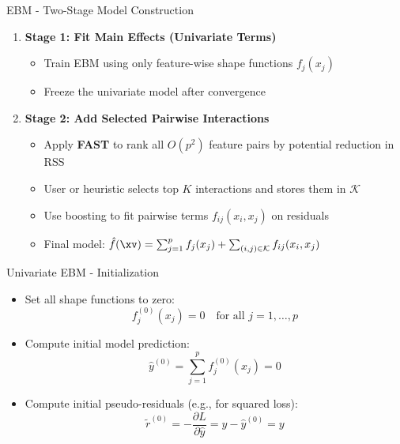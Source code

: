 \documentclass[11pt,compress,t,notes=noshow, aspectratio=169, xcolor=table]{beamer}
\begin{document}
\begin{frame}{EBM - Two-Stage Model Construction}
\begin{enumerate}
    \item \textbf{Stage 1: Fit Main Effects (Univariate Terms)}
    \begin{itemize}
        \item Train EBM using only feature-wise shape functions $f_j(x_j)$
        \item Freeze the univariate model after convergence
    \end{itemize}
    
    \item \textbf{Stage 2: Add Selected Pairwise Interactions}
    \begin{itemize}
        \item Apply \textbf{FAST} to rank all $O(p^2)$ feature pairs by potential reduction in RSS
        \item User or heuristic selects top $K$ interactions and stores them in $\mathcal{K}$
        \item Use boosting to fit pairwise terms $f_{ij}(x_i, x_j)$ on residuals
        \item Final model: $\hat{f}(\xv) = \sum_{j=1}^p f_j(x_j) + \sum_{(i,j)\in\mathcal{K}} f_{ij}(x_i, x_j)$
    \end{itemize}
\end{enumerate}

\end{frame}



\begin{frame}{Univariate EBM - Initialization}

\begin{itemize}
    \item Set all shape functions to zero:
    $$
    f_j^{(0)}(x_j) = 0 \quad \text{for all } j = 1, \dots, p
    $$
    \item Compute initial model prediction:
    $$
    \hat{y}^{(0)} = \sum_{j=1}^p f_j^{(0)}(x_j) = 0
    $$
    \item Compute initial pseudo-residuals (e.g., for squared loss):
    $$
    \tilde{r}^{(0)} = -\frac{\partial L}{\partial \hat{y}} = y - \hat{y}^{(0)} = y
    $$
\end{itemize}

\end{frame}
\end{document}
